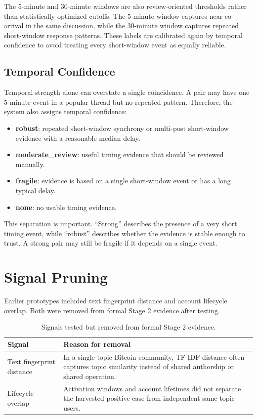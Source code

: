 \documentclass[conference]{IEEEtran}
\begin{document}
The 5-minute and 30-minute windows are also review-oriented thresholds rather
than statistically optimized cutoffs. The 5-minute window captures near
co-arrival in the same discussion, while the 30-minute window captures repeated
short-window response patterns. These labels are calibrated again by temporal
confidence to avoid treating every short-window event as equally reliable.

\subsection{Temporal Confidence}

Temporal strength alone can overstate a single coincidence. A pair may have
one 5-minute event in a popular thread but no repeated pattern. Therefore, the
system also assigns temporal confidence:
\begin{itemize}
  \item \textbf{robust}: repeated short-window synchrony or multi-post
  short-window evidence with a reasonable median delay.
  \item \textbf{moderate\_review}: useful timing evidence that should be
  reviewed manually.
  \item \textbf{fragile}: evidence is based on a single short-window event or
  has a long typical delay.
  \item \textbf{none}: no usable timing evidence.
\end{itemize}

This separation is important. ``Strong'' describes the presence of a very
short timing event, while ``robust'' describes whether the evidence is stable
enough to trust. A strong pair may still be fragile if it depends on a single
event.

\section{Signal Pruning}

Earlier prototypes included text fingerprint distance and account lifecycle
overlap. Both were removed from formal Stage 2 evidence after testing.

\begin{table}[htbp]
\centering
\caption{Signals tested but removed from formal Stage 2 evidence.}
\label{tab:pruning}
\small
\begin{tabular}{p{}p{}}
\toprule
Signal & Reason for removal \\
\midrule
Text fingerprint distance & In a single-topic Bitcoin community, TF-IDF distance often captures topic similarity instead of shared authorship or shared operation. \\
Lifecycle overlap & Activation windows and account lifetimes did not separate the harvested positive case from independent same-topic users. \\
\bottomrule
\end{tabular}
\end{table}
\end{document}
